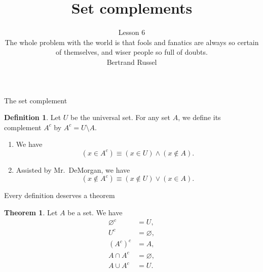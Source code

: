 \documentclass[fleqn]{beamer}
\subtitle{Lesson 6 \\ \vspace{1.0in} The whole problem with the world is that fools and fanatics are always so certain of themselves, and wiser people so full of doubts. \\ \vspace{0.25in} Bertrand Russel}
\title{\textbf{Set complements}}
\date{}
\theoremstyle{definition}
\newtheorem{mydef}{Definition}
\newtheorem{myth}{Theorem}
\newenvironment{checklist}{
  \begin{enumerate}[\ding{51}]
    \addtolength{\itemsep}{-0.0\itemsep}}
  {\end{enumerate}}
\begin{document}
\frame{\titlepage}

\begin{frame}{The set complement}

\begin{mydef}  Let \( U \) be the universal set. For any set \(A\), we define its complement \(A^c\) by \(A^c = U  \setminus A\).

\end{mydef}


\begin{checklist}

\item We have
\[
     (x \in A^c)  \equiv   (x \in U)    \land  (x \notin A)  .
\]

\item Assisted by Mr.\  DeMorgan, we have
\[
     (x \notin A^c)  \equiv   (x \notin U)    \lor   (x  \in A)  .
\]


\end{checklist}
\end{frame}


\begin{frame}{Every definition deserves a theorem}


\begin{myth} Let \(A\) be a set.  We have
\begin{align*}
    \varnothing^c &= U, \\
    U^c  &= \varnothing, \\
    (A^c)^c & = A, \\
      A \cap A^c &= \varnothing, \\
       A \cup A^c &=  U.
\end{align*}

\end{myth}
\end{frame}
\end{document}
